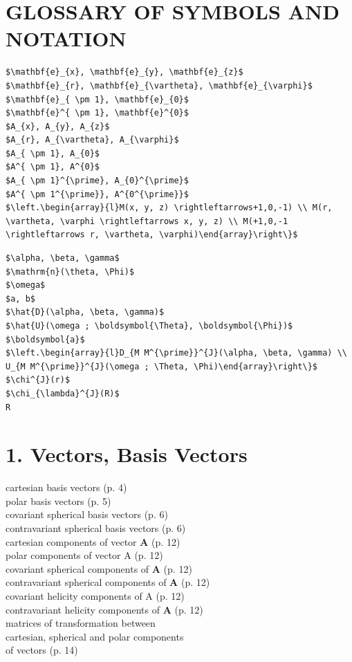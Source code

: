 \section*{GLOSSARY OF SYMBOLS AND NOTATION}
\begin{verbatim}
$\mathbf{e}_{x}, \mathbf{e}_{y}, \mathbf{e}_{z}$
$\mathbf{e}_{r}, \mathbf{e}_{\vartheta}, \mathbf{e}_{\varphi}$
$\mathbf{e}_{ \pm 1}, \mathbf{e}_{0}$
$\mathbf{e}^{ \pm 1}, \mathbf{e}^{0}$
$A_{x}, A_{y}, A_{z}$
$A_{r}, A_{\vartheta}, A_{\varphi}$
$A_{ \pm 1}, A_{0}$
$A^{ \pm 1}, A^{0}$
$A_{ \pm 1}^{\prime}, A_{0}^{\prime}$
$A^{ \pm 1^{\prime}}, A^{0^{\prime}}$
$\left.\begin{array}{l}M(x, y, z) \rightleftarrows+1,0,-1) \\ M(r, \vartheta, \varphi \rightleftarrows x, y, z) \\ M(+1,0,-1 \rightleftarrows r, \vartheta, \varphi)\end{array}\right\}$
\end{verbatim}

\begin{verbatim}
$\alpha, \beta, \gamma$
$\mathrm{n}(\theta, \Phi)$
$\omega$
$a, b$
$\hat{D}(\alpha, \beta, \gamma)$
$\hat{U}(\omega ; \boldsymbol{\Theta}, \boldsymbol{\Phi})$
$\boldsymbol{a}$
$\left.\begin{array}{l}D_{M M^{\prime}}^{J}(\alpha, \beta, \gamma) \\ U_{M M^{\prime}}^{J}(\omega ; \Theta, \Phi)\end{array}\right\}$
$\chi^{J}(r)$
$\chi_{\lambda}^{J}(R)$
R
\end{verbatim}

\section*{1. Vectors, Basis Vectors}
cartesian basis vectors (p. 4)\\
polar basis vectors (p. 5)\\
covariant spherical basis vectors (p. 6)\\
contravariant spherical basis vectors (p. 6)\\
cartesian components of vector $\mathbf{A}$ (p. 12)\\
polar components of vector A (p. 12)\\
covariant spherical components of $\mathbf{A}$ (p. 12)\\
contravariant spherical components of $\mathbf{A}$ (p. 12)\\
covariant helicity components of A (p. 12)\\
contravariant helicity components of $\mathbf{A}$ (p. 12)\\
matrices of transformation between\\
cartesian, spherical and polar components\\
of vectors (p. 14)

